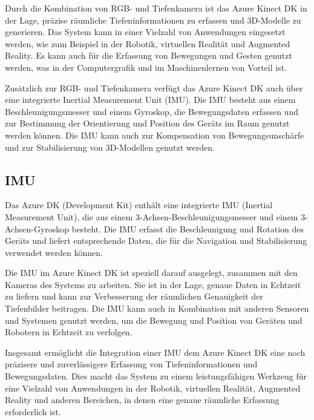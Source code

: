     

    Durch die Kombination von RGB- und Tiefenkamera ist das Azure Kinect \ac{DK} in der Lage, präzise räumliche Tiefeninformationen zu erfassen und 3D-Modelle zu generieren. Das System kann in einer Vielzahl von Anwendungen eingesetzt werden, wie zum Beispiel in der Robotik, virtuellen Realität und Augmented Reality. Es kann auch für die Erfassung von Bewegungen und Gesten genutzt werden, was in der Computergrafik und im Maschinenlernen von Vorteil ist.


    Zusätzlich zur RGB- und Tiefenkamera verfügt das Azure Kinect \ac{DK} auch über eine integrierte Inertial Measurement Unit (\ac{IMU}). Die \ac{IMU} besteht aus einem Beschleunigungsmesser und einem Gyroskop, die Bewegungsdaten erfassen und zur Bestimmung der Orientierung und Position des Geräts im Raum genutzt werden können. Die \ac{IMU} kann auch zur Kompensation von Bewegungsunschärfe und zur Stabilisierung von 3D-Modellen genutzt werden.

\subsection{\acl{IMU}}

Das Azure DK (Development Kit) enthält eine integrierte IMU (Inertial Measurement Unit), die aus einem 3-Achsen-Beschleunigungsmesser und einem 3-Achsen-Gyroskop besteht. Die IMU erfasst die Beschleunigung und Rotation des Geräts und liefert entsprechende Daten, die für die Navigation und Stabilisierung verwendet werden können.

Die \ac{IMU} im Azure Kinect \ac{DK} ist speziell darauf ausgelegt, zusammen mit den Kameras des Systems zu arbeiten. Sie ist in der Lage, genaue Daten in Echtzeit zu liefern und kann zur Verbesserung der räumlichen Genauigkeit der Tiefenbilder beitragen. Die IMU kann auch in Kombination mit anderen Sensoren und Systemen genutzt werden, um die Bewegung und Position von Geräten und Robotern in Echtzeit zu verfolgen.


Insgesamt ermöglicht die Integration einer \ac{IMU} dem Azure Kinect \ac{DK} eine noch präzisere und zuverlässigere Erfassung von Tiefeninformationen und Bewegungsdaten. Dies macht das System zu einem leistungsfähigen Werkzeug für eine Vielzahl von Anwendungen in der Robotik, virtuellen Realität, Augmented Reality und anderen Bereichen, in denen eine genaue räumliche Erfassung erforderlich ist.

